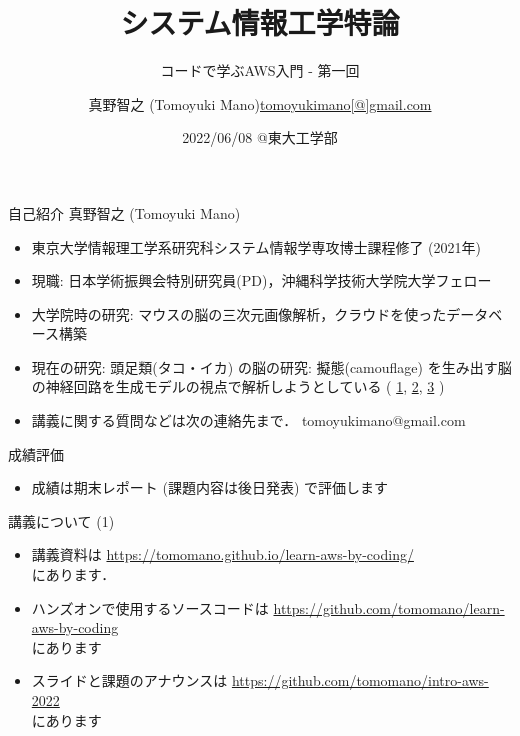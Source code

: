 \documentclass[unicode,11pt]{beamer}
\title{システム情報工学特論}
\subtitle{コードで学ぶAWS入門 - 第一回}
\author[Tomoyuki Mano]{\texorpdfstring{真野智之 (Tomoyuki Mano)\newline\url{tomoyukimano[@]gmail.com}}{Author}}
\institute[OIST]{Okinawa Institute of Science and Technology (OIST)}
\date{2022/06/08 @東大工学部}
\begin{document}
\frame{\titlepage}

\begin{frame}{自己紹介}
真野智之 (Tomoyuki Mano)
\begin{itemize}
    \item 東京大学情報理工学系研究科システム情報学専攻博士課程修了 (2021年)
    \item 現職: 日本学術振興会特別研究員(PD)，沖縄科学技術大学院大学フェロー
    \item 大学院時の研究: マウスの脳の三次元画像解析，クラウドを使ったデータベース構築
    \item 現在の研究: 頭足類(タコ・イカ) の脳の研究: 擬態(camouflage) を生み出す脳の神経回路を生成モデルの視点で解析しようとしている
    (
    \href{https://twitter.com/CephWarden/status/1142083856893263872}{1},
    \href{https://twitter.com/CephWarden/status/1384644335069667334}{2},
    \href{https://twitter.com/CephWarden/status/1232307456346181632}{3}
    )
    \item 講義に関する質問などは次の連絡先まで． tomoyukimano@gmail.com
\end{itemize}
\end{frame}

\begin{frame}{成績評価}
\begin{itemize}
    \item 成績は期末レポート (課題内容は後日発表) で評価します
\end{itemize}
\end{frame}

\begin{frame}{講義について (1)}
\begin{itemize}
    \item 講義資料は
    \url{https://tomomano.github.io/learn-aws-by-coding/}\\
    にあります．
    \item ハンズオンで使用するソースコードは \url{https://github.com/tomomano/learn-aws-by-coding}\\
    にあります
    \item スライドと課題のアナウンスは
    \url{https://github.com/tomomano/intro-aws-2022}\\
    にあります
\end{itemize}
\end{frame}
\end{document}
